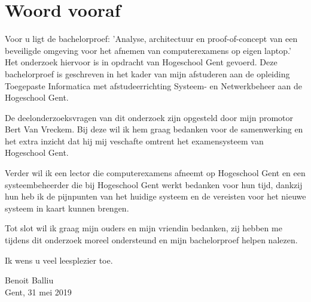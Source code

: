 
\chapter*{Woord vooraf}
\label{ch:voorwoord}


Voor u ligt de bachelorproef: 'Analyse, architectuur en proof-of-concept van een beveiligde omgeving voor het afnemen van computerexamens op eigen laptop.' Het onderzoek hiervoor is in opdracht van Hogeschool Gent gevoerd. Deze bachelorproef is geschreven in het kader van mijn afstuderen aan de opleiding Toegepaste Informatica met afstudeerrichting Systeem- en Netwerkbeheer aan de Hogeschool Gent.

De deelonderzoeksvragen van dit onderzoek zijn opgesteld door mijn promotor Bert Van Vreckem. Bij deze wil ik hem graag bedanken voor de samenwerking en het extra inzicht dat hij mij veschafte omtrent het examensysteem van Hogeschool Gent. 

Verder wil ik een lector die computerexamens afneemt op Hogeschool Gent en een systeembeheerder die bij Hogeschool Gent werkt bedanken voor hun tijd, dankzij hun heb ik de pijnpunten van het huidige systeem en de vereisten voor het nieuwe systeem in kaart kunnen brengen.

Tot slot wil ik graag mijn ouders en mijn vriendin bedanken, zij hebben me tijdens dit onderzoek moreel ondersteund en mijn bachelorproef helpen nalezen.

Ik wens u veel leesplezier toe.

Benoit Balliu \\
Gent, 31 mei 2019 